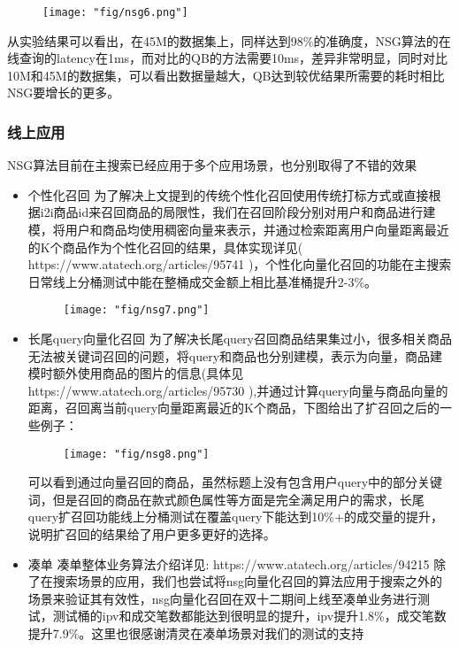 \begin{figure}[!h]
	\centering
	\texttt{[image: "fig/nsg6.png"]}
	\caption{}
	\label{fig:nsg6}
\end{figure}

从实验结果可以看出，在45M的数据集上，同样达到98\%的准确度，NSG算法的在线查询的latency在1ms，而对比的QB的方法需要10ms，差异非常明显，同时对比10M和45M的数据集，可以看出数据量越大，QB达到较优结果所需要的耗时相比NSG要增长的更多。
\subsubsection{线上应用}
NSG算法目前在主搜索已经应用于多个应用场景，也分别取得了不错的效果
\begin{itemize}
\item 个性化召回
为了解决上文提到的传统个性化召回使用传统打标方式或直接根据i2i商品id来召回商品的局限性，我们在召回阶段分别对用户和商品进行建模，将用户和商品均使用稠密向量来表示，并通过检索距离用户向量距离最近的K个商品作为个性化召回的结果，具体实现详见( https://www.atatech.org/articles/95741 )，个性化向量化召回的功能在主搜索日常线上分桶测试中能在整桶成交金额上相比基准桶提升2-3\%。

\begin{figure}[!h]
	\centering
	\texttt{[image: "fig/nsg7.png"]}
	\caption{}
	\label{fig:nsg7}
\end{figure}

\item 长尾query向量化召回
为了解决长尾query召回商品结果集过小，很多相关商品无法被关键词召回的问题，将query和商品也分别建模，表示为向量，商品建模时额外使用商品的图片的信息(具体见
 https://www.atatech.org/articles/95730 ),并通过计算query向量与商品向量的距离，召回离当前query向量距离最近的K个商品，下图给出了扩召回之后的一些例子：
\begin{figure}[!h]
	\centering
	\texttt{[image: "fig/nsg8.png"]}
	\caption{}
	\label{fig:nsg8}
\end{figure}

可以看到通过向量召回的商品，虽然标题上没有包含用户query中的部分关键词，但是召回的商品在款式颜色属性等方面是完全满足用户的需求，长尾query扩召回功能线上分桶测试在覆盖query下能达到10\%+的成交量的提升，说明扩召回的结果给了用户更多更好的选择。
\item 凑单
凑单整体业务算法介绍详见: https://www.atatech.org/articles/94215  
除了在搜索场景的应用，我们也尝试将nsg向量化召回的算法应用于搜索之外的场景来验证其有效性，nsg向量化召回在双十二期间上线至凑单业务进行测试，测试桶的ipv和成交笔数都能达到很明显的提升，ipv提升1.8\%，成交笔数提升7.9\%。这里也很感谢清灵在凑单场景对我们的测试的支持~
\end{itemize}



